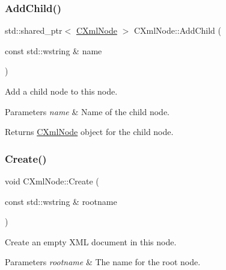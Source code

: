 \subsubsection{\texorpdfstring{Add\+Child()}{AddChild()}}
{\footnotesize\ttfamily std\+::shared\+\_\+ptr$<$ \mbox{\hyperlink{classxmlnode_1_1_c_xml_node}{C\+Xml\+Node}} $>$ C\+Xml\+Node\+::\+Add\+Child (\begin{DoxyParamCaption}\item[{const std\+::wstring \&}]{name }\end{DoxyParamCaption})}



Add a child node to this node. 


\begin{DoxyParams}{Parameters}
{\em name} & Name of the child node. \\
\hline
\end{DoxyParams}
\begin{DoxyReturn}{Returns}
\mbox{\hyperlink{classxmlnode_1_1_c_xml_node}{C\+Xml\+Node}} object for the child node. 
\end{DoxyReturn}
\mbox{\label{classxmlnode_1_1_c_xml_node_a7f4a7dee5a7de490507b9d0ed78dbab7}} 
\subsubsection{\texorpdfstring{Create()}{Create()}}
{\footnotesize\ttfamily void C\+Xml\+Node\+::\+Create (\begin{DoxyParamCaption}\item[{const std\+::wstring \&}]{rootname }\end{DoxyParamCaption})}



Create an empty X\+ML document in this node. 


\begin{DoxyParams}{Parameters}
{\em rootname} & The name for the root node. \\
\hline
\end{DoxyParams}
\mbox{\label{classxmlnode_1_1_c_xml_node_ae50a4482c4ea73492001f91788945bb1}} 
